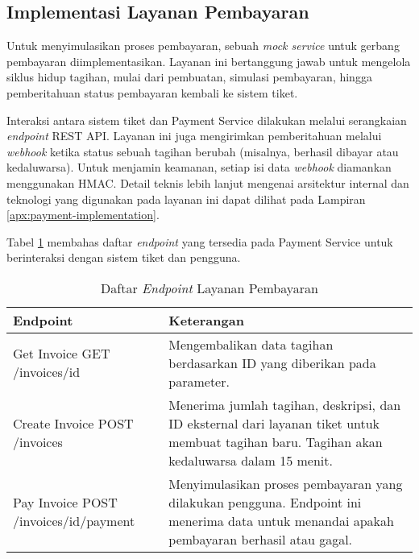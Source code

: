\subsection{Implementasi Layanan Pembayaran}

Untuk menyimulasikan proses pembayaran, sebuah \textit{mock service} untuk gerbang pembayaran diimplementasikan. Layanan ini bertanggung jawab untuk mengelola siklus hidup tagihan, mulai dari pembuatan, simulasi pembayaran, hingga pemberitahuan status pembayaran kembali ke sistem tiket.

Interaksi antara sistem tiket dan Payment Service dilakukan melalui serangkaian \textit{endpoint} REST API. Layanan ini juga mengirimkan pemberitahuan melalui \textit{webhook} ketika status sebuah tagihan berubah (misalnya, berhasil dibayar atau kedaluwarsa). Untuk menjamin keamanan, setiap isi data \textit{webhook} diamankan menggunakan HMAC. Detail teknis lebih lanjut mengenai arsitektur internal dan teknologi yang digunakan pada layanan ini dapat dilihat pada Lampiran \ref{apx:payment-implementation}.

Tabel \ref{table:payment-endpoint} membahas daftar \textit{endpoint} yang tersedia pada Payment Service untuk berinteraksi dengan sistem tiket dan pengguna.

\begin{table}[H]
    \centering
    \caption{Daftar \textit{Endpoint} Layanan Pembayaran}
    \label{table:payment-endpoint}
    \begin{tabular}{|p{}|p{}|}
        \hline
        \textbf{Endpoint}                                & \textbf{Keterangan}                                                                                                                          \\
        \hline
        Get Invoice \newline GET /invoices/{id}          & Mengembalikan data tagihan berdasarkan ID yang diberikan pada parameter.                                                                     \\
        \hline
        Create Invoice \newline POST /invoices           & Menerima jumlah tagihan, deskripsi, dan ID eksternal dari layanan tiket untuk membuat tagihan baru. Tagihan akan kedaluwarsa dalam 15 menit. \\
        \hline
        Pay Invoice \newline POST /invoices/{id}/payment & Menyimulasikan proses pembayaran yang dilakukan pengguna. Endpoint ini menerima data untuk menandai apakah pembayaran berhasil atau gagal.   \\
        \hline
    \end{tabular}
\end{table}
